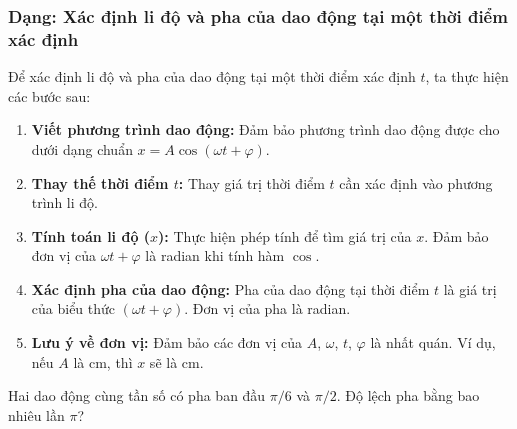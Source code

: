 \subsubsection{Dạng: Xác định li độ và pha của dao động tại một thời điểm xác định}
\begin{phuongphap}
Để xác định li độ và pha của dao động tại một thời điểm xác định $t$, ta thực hiện các bước sau:
\begin{enumerate}
    \item \textbf{Viết phương trình dao động:} Đảm bảo phương trình dao động được cho dưới dạng chuẩn $x = A\cos(\omega t + \varphi)$.
    \item \textbf{Thay thế thời điểm $t$:} Thay giá trị thời điểm $t$ cần xác định vào phương trình li độ.
    \item \textbf{Tính toán li độ ($x$):} Thực hiện phép tính để tìm giá trị của $x$. Đảm bảo đơn vị của $\omega t + \varphi$ là radian khi tính hàm $\cos$.
    \item \textbf{Xác định pha của dao động:} Pha của dao động tại thời điểm $t$ là giá trị của biểu thức $(\omega t + \varphi)$. Đơn vị của pha là radian.
    \item \textbf{Lưu ý về đơn vị:} Đảm bảo các đơn vị của $A$, $\omega$, $t$, $\varphi$ là nhất quán. Ví dụ, nếu $A$ là cm, thì $x$ sẽ là cm.
\end{enumerate}
\end{phuongphap}
\begin{vidumau}
Hai dao động cùng tần số có pha ban đầu $\pi/6$ và $\pi/2.$ Độ lệch pha bằng bao nhiêu lần $\pi$?
\end{vidumau}

